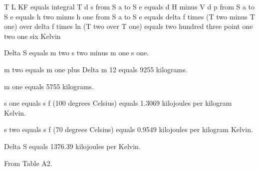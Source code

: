 T L KF equals integral T d s from S a to S e equals d H minus V d p from S a to S e equals h two minus h one from S a to S e equals delta f times (T two minus T one) over delta f times ln (T two over T one) equals two hundred three point one two one six Kelvin

Delta S equals m two s two minus m one s one.

m two equals m one plus Delta m 12 equals 9255 kilograms.

m one equals 5755 kilograms.

s one equals s f (100 degrees Celsius) equals 1.3069 kilojoules per kilogram Kelvin.

s two equals s f (70 degrees Celsius) equals 0.9549 kilojoules per kilogram Kelvin.

Delta S equals 1376.39 kilojoules per Kelvin.

From Table A2.
